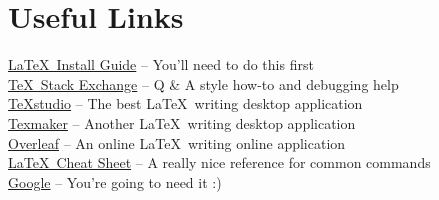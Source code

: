 \chapter{Useful Links}\label{ap:links}
\href{https://www.latex-tutorial.com/installation/}{\LaTeX\ Install Guide}
-- You'll need to do this first\\
\href{https://tex.stackexchange.com/questions/9363}{\TeX\ Stack Exchange}
-- Q \& A style how-to and debugging help\\
\href{https://www.texstudio.org/}{TeXstudio}
-- The best \LaTeX\ writing desktop application\\
\href{http://www.xm1math.net/texmaker/}{Texmaker}
-- Another \LaTeX\ writing desktop application\\
\href{https://www.overleaf.com/}{Overleaf}
-- An online \LaTeX\ writing online application\\
\href{https://wch.github.io/latexsheet/latexsheet.pdf}{\LaTeX\ Cheat Sheet}
-- A really nice reference for common commands\\
\href{https://www.youtube.com/watch?v=dQw4w9WgXcQ}{Google}
-- You're going to need it :)\\